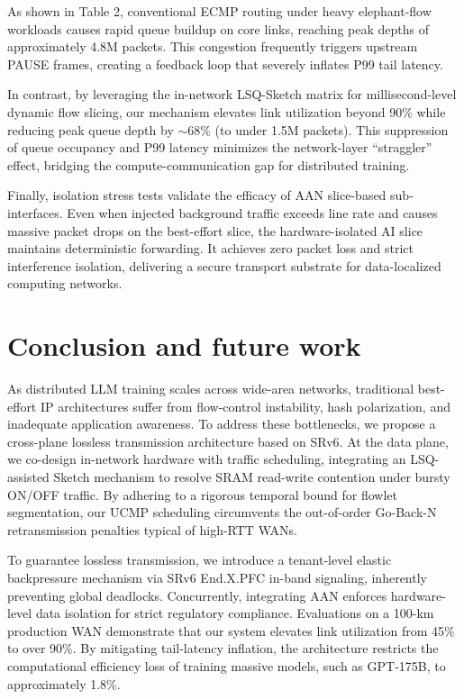 \documentclass[a4paper]{jpconf}
\begin{document}
As shown in Table 2, conventional ECMP routing under heavy elephant-flow workloads causes rapid queue buildup on core links, reaching peak depths of approximately 4.8M packets. This congestion frequently triggers upstream PAUSE frames, creating a feedback loop that severely inflates P99 tail latency.


In contrast, by leveraging the in-network LSQ-Sketch matrix for millisecond-level dynamic flow slicing, our mechanism elevates link utilization beyond 90\% while reducing peak queue depth by $\sim$68\% (to under 1.5M packets). This suppression of queue occupancy and P99 latency minimizes the network-layer ``straggler'' effect, bridging the compute-communication gap for distributed training.


Finally, isolation stress tests validate the efficacy of AAN slice-based sub-interfaces. Even when injected background traffic exceeds line rate and causes massive packet drops on the best-effort slice, the hardware-isolated AI slice maintains deterministic forwarding. It achieves zero packet loss and strict interference isolation, delivering a secure transport substrate for data-localized computing networks.


\section{Conclusion and future work}


As distributed LLM training scales across wide-area networks, traditional best-effort IP architectures suffer from flow-control instability, hash polarization, and inadequate application awareness. To address these bottlenecks, we propose a cross-plane lossless transmission architecture based on SRv6. At the data plane, we co-design in-network hardware with traffic scheduling, integrating an LSQ-assisted Sketch mechanism to resolve SRAM read-write contention under bursty ON/OFF traffic. By adhering to a rigorous temporal bound for flowlet segmentation, our UCMP scheduling circumvents the out-of-order Go-Back-N retransmission penalties typical of high-RTT WANs.


To guarantee lossless transmission, we introduce a tenant-level elastic backpressure mechanism via SRv6 End.X.PFC in-band signaling, inherently preventing global deadlocks. Concurrently, integrating AAN enforces hardware-level data isolation for strict regulatory compliance. Evaluations on a 100-km production WAN demonstrate that our system elevates link utilization from 45\% to over 90\%. By mitigating tail-latency inflation, the architecture restricts the computational efficiency loss of training massive models, such as GPT-175B, to approximately 1.8\%.
\end{document}
